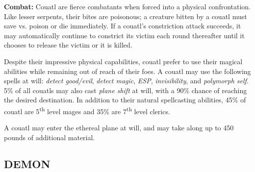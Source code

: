 \begin{multicols}{2}
\textbf{Combat:} Couatl are fierce combatants when forced into a physical confrontation. Like lesser serpents, their bites are poisonous; a creature bitten by a couatl must save vs. poison or die immediately. If a couatl's constriction attack succeeds, it may automatically continue to constrict its victim each round thereafter until it chooses to release the victim or it is killed.

Despite their impressive physical capabilities, couatl prefer to use their magical abilities while remaining out of reach of their foes. A couatl may use the following spells at will: \textit{detect good/evil}, \textit{detect magic}, \textit{ESP}, \textit{invisibility}, and \textit{polymorph self}. 5\% of all couatls may also cast \textit{plane shift} at will, with a 90\% chance of reaching the desired destination. In addition to their natural spellcasting abilities, 45\% of couatl are 5\textsuperscript{th} level mages and 35\% are 7\textsuperscript{th} level clerics.

A couatl may enter the ethereal plane at will, and may take along up to 450 pounds of additional material.

\noindent \begin{minipage}{\columnwidth}

\vspace{1em}

\subsection{DEMON}


\end{minipage}
\end{multicols}
